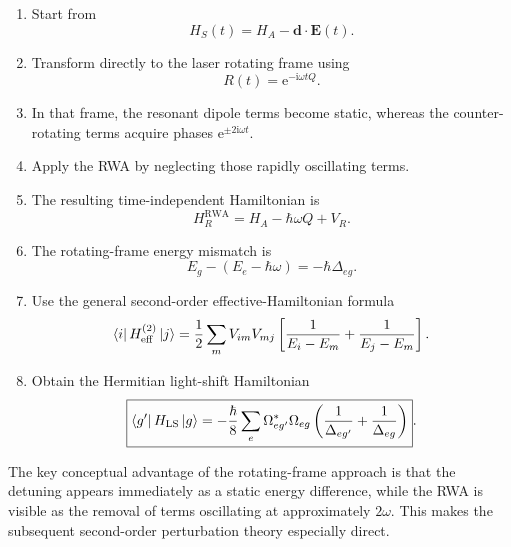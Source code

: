 \documentclass[11pt]{article}
\newcommand{\ee}{\mathrm{e}}
\newcommand{\ii}{\mathrm{i}}
\newcommand{\HLS}{H_{\mathrm{LS}}}
\newcommand{\Hatom}{H_A}
\newcommand{\VR}{V_R}
\newcommand{\HR}{H_R}
\newcommand{\projE}{Q}
\begin{document}
\begin{enumerate}[label=\textbf{Step \arabic*.}]
\item Start from
\begin{equation}
H_S(t)=\Hatom-\bm d\cdot\bm E(t).
\end{equation}

\item Transform directly to the laser rotating frame using
\begin{equation}
R(t)=\ee^{-\ii\omega t\projE}.
\end{equation}

\item In that frame, the resonant dipole terms become static, whereas the counter-rotating terms acquire phases $\ee^{\pm2\ii\omega t}$.

\item Apply the RWA by neglecting those rapidly oscillating terms.

\item The resulting time-independent Hamiltonian is
\begin{equation}
\HR^{\mathrm{RWA}}
=
\Hatom-\hbar\omega\projE+\VR.
\end{equation}

\item The rotating-frame energy mismatch is
\begin{equation}
E_g-(E_e-\hbar\omega)
=-\hbar\Delta_{eg}.
\end{equation}

\item Use the general second-order effective-Hamiltonian formula
\begin{equation}
\bra{i}H_{\mathrm{eff}}^{(2)}\ket{j}
=
\frac{1}{2}
\sum_m
V_{im}V_{mj}
\left[
\frac{1}{E_i-E_m}
+
\frac{1}{E_j-E_m}
\right].
\end{equation}

\item Obtain the Hermitian light-shift Hamiltonian
\begin{equation}
\boxed{
\bra{g'}\HLS\ket{g}
=
-\frac{\hbar}{8}
\sum_e
\Omega_{eg'}^*\Omega_{eg}
\left(
\frac{1}{\Delta_{eg'}}
+
\frac{1}{\Delta_{eg}}
\right)
}.
\end{equation}
\end{enumerate}

The key conceptual advantage of the rotating-frame approach is that the detuning appears immediately as a static energy difference, while the RWA is visible as the removal of terms oscillating at approximately $2\omega$. This makes the subsequent second-order perturbation theory especially direct.
\end{document}
